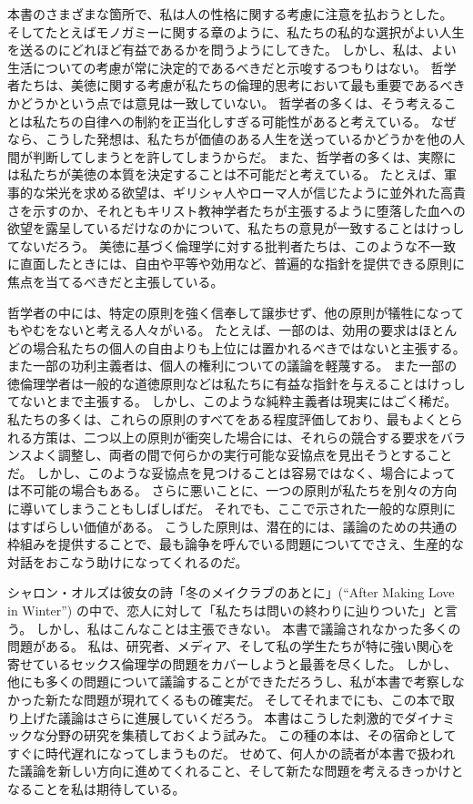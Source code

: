 \documentclass[paper=a4,book,openany]{jlreq}
\begin{document}
本書のさまざまな箇所で、私は人の性格に関する考慮に注意を払おうとした。
そしてたとえばモノガミーに関する章のように、私たちの私的な選択がよい人生を送るのにどれほど有益であるかを問うようにしてきた。
しかし、私は、よい生活についての考慮が常に決定的であるべきだと示唆するつもりはない。
哲学者たちは、美徳に関する考慮が私たちの倫理的思考において最も重要であるべきかどうかという点では意見は一致していない。
哲学者の多くは、そう考えることは私たちの自律への制約を正当化しすぎる可能性があると考えている。
なぜなら、こうした発想は、私たちが価値のある人生を送っているかどうかを他の人間が判断してしまうとを許してしまうからだ。
また、哲学者の多くは、実際には私たちが美徳の本質を決定することは不可能だと考えている。
たとえば、軍事的な栄光を求める欲望は、ギリシャ人やローマ人が信じたように並外れた高貴さを示すのか、それともキリスト教神学者たちが主張するように堕落した血への欲望を露呈しているだけなのかについて、私たちの意見が一致することはけっしてないだろう。
美徳に基づく倫理学に対する批判者たちは、このような不一致に直面したときには、自由や平等や効用など、普遍的な指針を提供できる原則に焦点を当てるべきだと主張している。

\vspace{1\zw}

哲学者の中には、特定の原則を強く信奉して譲歩せず、他の原則が犠牲になってもやむをないと考える人々がいる。
たとえば、一部のは、効用の要求はほとんどの場合私たちの個人の自由よりも上位には置かれるべきではないと主張する。
また一部の功利主義者は、個人の権利についての議論を軽蔑する。
また一部の徳倫理学者は一般的な道徳原則などは私たちに有益な指針を与えることはけっしてないとまで主張する。
しかし、このような純粋主義者は現実にはごく稀だ。
私たちの多くは、これらの原則のすべてをある程度評価しており、最もよくとられる方策は、二つ以上の原則が衝突した場合には、それらの競合する要求をバランスよく調整し、両者の間で何らかの実行可能な妥協点を見出そうとすることだ。
しかし、このような妥協点を見つけることは容易ではなく、場合によっては不可能の場合もある。
さらに悪いことに、一つの原則が私たちを別々の方向に導いてしまうこともしばしばだ。
それでも、ここで示された一般的な原則にはすばらしい価値がある。
こうした原則は、潜在的には、議論のための共通の枠組みを提供することで、最も論争を呼んでいる問題についてでさえ、生産的な対話をおこなう助けになってくれるのだ。

\vspace{1\zw}

シャロン・オルズは彼女の詩「冬のメイクラブのあとに」(``After Making Love in Winter'') の中で、恋人に対して「私たちは問いの終わりに辿りついた」と言う。
しかし、私はこんなことは主張できない。
本書で議論されなかった多くの問題がある。
私は、研究者、メディア、そして私の学生たちが特に強い関心を寄せているセックス倫理学の問題をカバーしようと最善を尽くした。
しかし、他にも多くの問題について議論することができただろうし、私が本書で考察しなかった新たな問題が現れてくるもの確実だ。
そしてそれまでにも、この本で取り上げた議論はさらに進展していくだろう。
本書はこうした刺激的でダイナミックな分野の研究を集積しておくよう試みた。
この種の本は、その宿命としてすぐに時代遅れになってしまうものだ。
せめて、何人かの読者が本書で扱われた議論を新しい方向に進めてくれること、そして新たな問題を考えるきっかけとなることを私は期待している。
\end{document}
